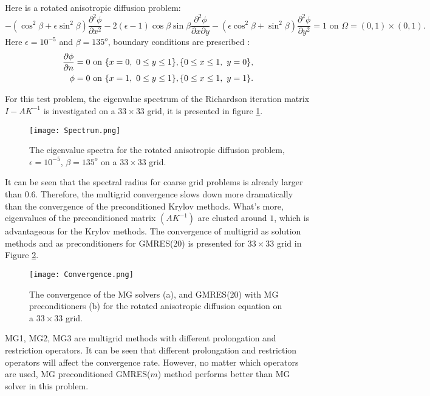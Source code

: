 \begin{exm}
  Here is a rotated anisotropic diffusion problem:
  \begin{equation}
    \label{eq:RotatingCon-D}
    -(\cos^2\beta +\epsilon\sin^2\beta)\frac{\partial^2\phi}{\partial
      x^2} - 2(\epsilon -
    1)\cos\beta\sin\beta\frac{\partial^2\phi}{\partial x\partial y} -
    (\epsilon\cos^2\beta + \sin^2\beta)\frac{\partial^2\phi}{\partial
      y^2} = 1
    \mbox{ on } \Omega=(0,1)\times (0,1).
\end{equation}
Here $\epsilon=10^{-5}$ and $\beta=135^o$, boundary conditions are prescribed :
\begin{equation}
  \begin{aligned}
    \frac{\partial \phi}{\partial n} = 0 \mbox{ on } \{x=0,\ 0\leq y\leq 1\},\{0\leq
    x\leq 1,\ y=0\},\\
    \phi=0\mbox{ on } \{x=1,\ 0\leq y\leq 1\},\{0\leq x\leq 1,\ y=1\}.
  \end{aligned}
\end{equation}

For this test problem, the eigenvalue spectrum of the Richardson
iteration matrix $I-AK^{-1}$ is investigated on a $33\times 33$ grid,
it is presented in figure \ref{fig:spectrum}.

\begin{figure}[htbp]
      \centering
      \texttt{[image: Spectrum.png]}
      \caption{The eigenvalue spectra for the rotated anisotropic
        diffusion problem,$\epsilon=10^{-5}$, $\beta=135^o$ on a
        $33\times 33$ grid.}
      \label{fig:spectrum}
    \end{figure}

It can be seen that the spectral radius for coarse grid problems is
already larger than 0.6. Therefore, the multigrid convergence slows
down more dramatically than the convergence of the preconditioned
Krylov methods. What's more, eigenvalues of the preconditioned matrix
$(AK^{-1})$ are clusted around $1$, which is advantageous for the
Krylov methods. The convergence of multigrid as solution methods and
as preconditioners for GMRES(20) is presented for $33\times 33$ grid
in Figure \ref{fig:convergence}.

\begin{figure}[htbp]
      \centering
      \texttt{[image: Convergence.png]}
      \caption{The convergence of the MG solvers (a), and GMRES(20)
        with MG preconditioners (b) for the rotated anisotropic
        diffusion equation on a $33\times 33$ grid.}
      \label{fig:convergence}
    \end{figure}

MG1, MG2, MG3 are multigrid methods with different prolongation and
restriction operators. It can be seen that different prolongation and
restriction operators will affect the convergence rate. However, no
matter which operators are used, MG preconditioned GMRES($m$) method
performs better than MG solver in this problem.
\end{exm}



